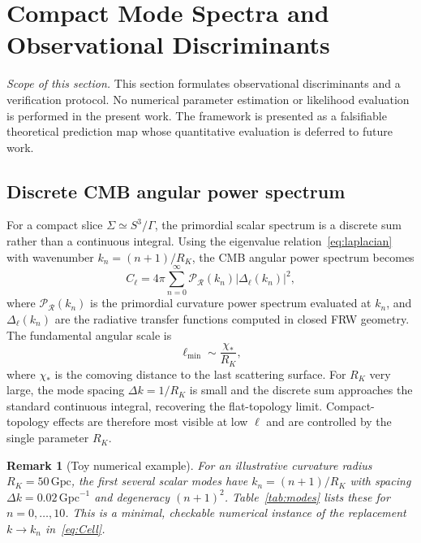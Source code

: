 \documentclass[12pt,a4paper]{article}
\newtheorem{remark}{Remark}[section]
\newcommand{\Sig}{\Sigma}           %
\newcommand{\RK}{R_K}
\begin{document}
\section{Compact Mode Spectra and Observational
         Discriminants}
\label{sec:obs}

\noindent\emph{Scope of this section.} This section
formulates observational discriminants and a verification
protocol. No numerical parameter estimation or likelihood
evaluation is performed in the present work. The framework
is presented as a falsifiable theoretical prediction map
whose quantitative evaluation is deferred to future work.

\subsection{Discrete CMB angular power spectrum}

For a compact slice $\Sig \simeq S^3/\Gamma$, the
primordial scalar spectrum is a discrete sum rather than
a continuous integral. Using the eigenvalue
relation~\eqref{eq:laplacian} with wavenumber $k_n =
(n+1)/\RK$, the CMB angular power spectrum becomes
\begin{equation}
  C_\ell = 4\pi\sum_{n=0}^{\infty}
  \mathcal{P}_\mathcal{R}(k_n)|\Delta_\ell(k_n)|^2,
  \label{eq:Cell}
\end{equation}
where $\mathcal{P}_\mathcal{R}(k_n)$ is the primordial
curvature power spectrum evaluated at $k_n$, and
$\Delta_\ell(k_n)$ are the radiative transfer functions
computed in closed FRW geometry. The fundamental angular
scale is
\begin{equation}
  \ell_{\min} \sim \frac{\chi_*}{\RK},
  \label{eq:ellmin}
\end{equation}
where $\chi_*$ is the comoving distance to the last
scattering surface. For $\RK$ very large, the mode spacing
$\Delta k = 1/\RK$ is small and the discrete sum
approaches the standard continuous integral, recovering
the flat-topology limit. Compact-topology effects are
therefore most visible at low $\ell$ and are controlled
by the single parameter $\RK$.

\begin{remark}[Toy numerical example]
For an illustrative curvature radius $\RK = 50\,\mathrm{Gpc}$,
the first several scalar modes have $k_n = (n+1)/\RK$
with spacing $\Delta k = 0.02\,\mathrm{Gpc}^{-1}$ and
degeneracy $(n+1)^2$. Table~\ref{tab:modes} lists these
for $n = 0,\ldots,10$. This is a minimal, checkable
numerical instance of the replacement $k\to k_n$
in~\eqref{eq:Cell}.
\end{remark}
\end{document}
